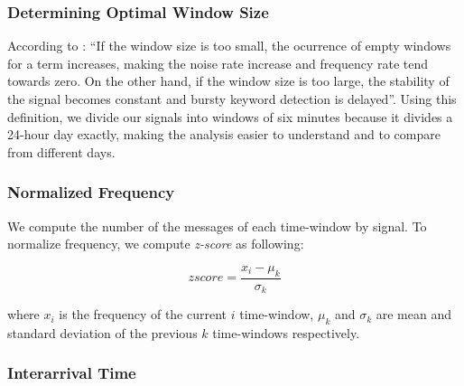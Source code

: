\documentclass[sigconf]{acmart}
\begin{document}
\subsubsection{Determining Optimal Window Size}

According to \citeauthor{guzman2013line} \cite{guzman2013line}: ``If the window size is too small, the ocurrence of empty windows for a term increases, making the noise rate increase and frequency rate tend towards zero. On the other hand, if the window size is too large, the stability of the signal becomes constant and bursty keyword detection is delayed''. Using this definition, we divide our signals into windows of six minutes because it divides a 24-hour day exactly, making the analysis easier to understand and to compare from different days.


\subsubsection{Normalized Frequency}
We compute the number of the messages of each time-window by signal. To normalize frequency, we compute \textit{z-score} as following:

\begin{equation} \label{eq:1}
zscore = \frac{x_{i} - \mu_{k} }{\sigma_{k}}
\end{equation}

where $x_{i}$ is the frequency of the current $i$ time-window, $\mu_{k}$ and  $\sigma_{k}$ are mean and standard deviation of the previous $k$ time-windows respectively.

\subsubsection{Interarrival Time}
\end{document}
